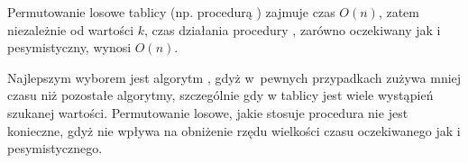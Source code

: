 \subexercise{} %
Permutowanie losowe tablicy (np. procedurą ) zajmuje czas $O(n)$, zatem niezależnie od wartości $k$, czas działania procedury , zarówno oczekiwany jak i pesymistyczny, wynosi $O(n)$.

\subexercise{} %
Najlepszym wyborem jest algorytm , gdyż w~pewnych przypadkach zużywa mniej czasu niż pozostałe algorytmy, szczególnie gdy w tablicy jest wiele wystąpień szukanej wartości. Permutowanie losowe, jakie stosuje procedura  nie jest konieczne, gdyż nie wpływa na obniżenie rzędu wielkości czasu oczekiwanego jak i pesymistycznego.

\endinput
